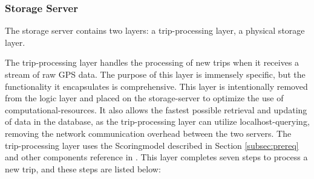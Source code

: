 \subsubsection{Storage Server}\label{subsec:storageserver}
The storage server contains two layers: a trip-processing layer, a physical storage layer.

The trip-processing layer handles the processing of new trips when it receives a stream of raw GPS data. The purpose of this layer is immensely specific, but the functionality it encapsulates is comprehensive. This layer is intentionally removed from the logic layer and placed on the storage-server to optimize the use of computational-resources. It also allows the fastest possible retrieval and updating of data in the database, as the trip-processing layer can utilize localhost-querying, removing the network communication overhead between the two servers. The trip-processing layer uses the Scoringmodel described in Section \ref{subsec:prereq} and other components reference in \cite{sw9_report}. This layer completes seven steps to process a new trip, and these steps are listed below:

